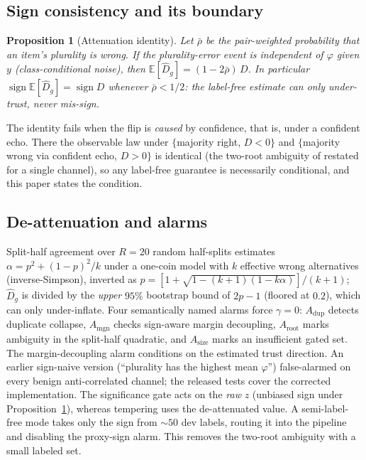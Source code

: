 \documentclass[conference]{IEEEtran}
\newtheorem{proposition}{Proposition}
\newcommand{\Dhat}{\widehat{D}}
\newcommand{\sign}{\operatorname{sign}}
\begin{document}
\subsection{Sign consistency and its boundary}
\begin{proposition}[Attenuation identity]\label{prop:ccn}
Let $\bar\rho$ be the pair-weighted probability that an item's plurality is wrong. If the plurality-error event is independent of $\varphi$ given $y$ (class-conditional noise), then
$\mathbb{E}[\Dhat_g]=(1-2\bar\rho)\,D$.
In particular $\sign\mathbb{E}[\Dhat_g]=\sign D$ whenever $\bar\rho<1/2$: the label-free estimate can only under-trust, never mis-sign.
\end{proposition}
The identity fails when the flip is \emph{caused} by confidence, that is, under a confident echo. There the observable law under $\{$majority right, $D<0\}$ and $\{$majority wrong via confident echo, $D>0\}$ is identical (the two-root ambiguity of \cite{parisi2014ranking} restated for a single channel), so any label-free guarantee is necessarily conditional, and this paper states the condition.

\subsection{De-attenuation and alarms}
Split-half agreement over $R{=}20$ random half-splits estimates $\alpha=p^2+(1-p)^2/k$ under a one-coin model with $k$ effective wrong alternatives (inverse-Simpson), inverted as $p=[1+\sqrt{1-(k{+}1)(1-k\alpha)}]/(k{+}1)$; $\Dhat_g$ is divided by the \emph{upper} $95\%$ bootstrap bound of $2p-1$ (floored at $0.2$), which can only under-inflate. Four semantically named alarms force $\gamma=0$: $A_{\mathrm{dup}}$ detects duplicate collapse, $A_{\mathrm{mgn}}$ checks sign-aware margin decoupling, $A_{\mathrm{root}}$ marks ambiguity in the split-half quadratic, and $A_{\mathrm{size}}$ marks an insufficient gated set. The margin-decoupling alarm conditions on the estimated trust direction. An earlier sign-naive version (``plurality has the highest mean $\varphi$'') false-alarmed on every benign anti-correlated channel; the released tests cover the corrected implementation. The significance gate acts on the \emph{raw} $z$ (unbiased sign under Proposition~\ref{prop:ccn}), whereas tempering uses the de-attenuated value. A semi-label-free mode takes only the sign from ${\sim}50$ dev labels, routing it into the pipeline and disabling the proxy-sign alarm. This removes the two-root ambiguity with a small labeled set.
\end{document}
